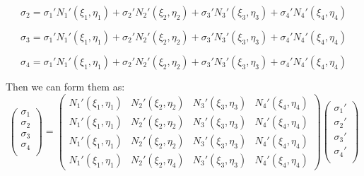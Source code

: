 \begin{equation}
\sigma_2 = {\sigma_1}' {N_1}'\left(\xi_1, \eta_1\right) + {\sigma_2}' {N_2}'\left(\xi_2, \eta_2\right) + {\sigma_3}' {N_3}'\left(\xi_3, \eta_3\right) + {\sigma_4}' {N_4}'\left(\xi_4, \eta_4\right)
\end{equation}

\begin{equation}
\sigma_3 = {\sigma_1}' {N_1}'\left(\xi_1, \eta_1\right) + {\sigma_2}' {N_2}'\left(\xi_2, \eta_2\right) + {\sigma_3}' {N_3}'\left( \xi_3, \eta_3\right) + {\sigma_4}' {N_4}'\left( \xi_4, \eta_4\right)
\end{equation}

\begin{equation}
\sigma_4 = {\sigma_1}' {N_1}'\left(\xi_1, \eta_1\right) + {\sigma_2}' {N_2}'\left(\xi_2, \eta_2\right) + {\sigma_3}' {N_3}'\left(\xi_3, \eta_3\right) + {\sigma_4}' {N_4}'\left(\xi_4, \eta_4\right)
\end{equation}

Then we can form them as:
\begin{equation}
\begin{pmatrix}
\sigma_1 \\
\sigma_2 \\
\sigma_3 \\
\sigma_4 \\
\end{pmatrix} = \begin{pmatrix}
 {N_1}'\left(\xi_1, \eta_1\right) &  {N_2}'\left(\xi_2, \eta_2\right) &    {N_3}'\left(\xi_3, \eta_3\right)  &  {N_4}'\left(\xi_4, \eta_4\right)     \\[0.3em]
 
 {N_1}'\left(\xi_1, \eta_1\right) & {N_2}'\left(\xi_2, \eta_2\right) &  {N_3}'\left(\xi_3, \eta_3\right)  & {N_4}'\left(\xi_4, \eta_4\right)            \\[0.3em]
 
 {N_1}'\left(\xi_1, \eta_1\right) & {N_2}' \left(\xi_2, \eta_2\right)  & {N_3}'\left(\xi_3, \eta_3\right) & {N_4}'\left(\xi_4, \eta_4\right)      \\[0.3em]

{N_1}'\left(\xi_1, \eta_1\right) &  {N_2}'\left(\xi_2, \eta_4\right) &  {N_3}'\left(\xi_3, \eta_3\right) &  {N_4}'\left(\xi_4, \eta_4\right)                             
\end{pmatrix} \begin{pmatrix}
{\sigma_1}' \\
{\sigma_2}' \\
{\sigma_3}' \\
{\sigma_4}' \\
\end{pmatrix}
\end{equation}	

